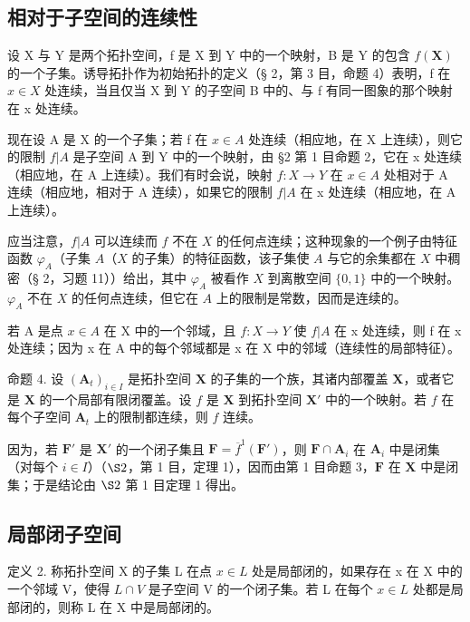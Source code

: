 \subsection{相对于子空间的连续性}

设 X 与 Y 是两个拓扑空间，f 是 X 到 Y 中的一个映射，B 是 Y 的包含 \(f(\mathbf{X})\) 的一个子集。诱导拓扑作为初始拓扑的定义（§ 2，第 3 目，命题 4）表明，f 在 \(x \in X\) 处连续，当且仅当 X 到 Y 的子空间 B 中的、与 f 有同一图象的那个映射在 x 处连续。

现在设 A 是 X 的一个子集；若 f 在 \(x \in A\) 处连续（相应地，在 X 上连续），则它的限制 \(f|A\) 是子空间 A 到 Y 中的一个映射，由 §2 第 1 目命题 2，它在 x 处连续（相应地，在 A 上连续）。我们有时会说，映射 \(f: X \to Y\) 在 \(x \in A\) 处相对于 A 连续（相应地，相对于 A 连续），如果它的限制 \(f|A\) 在 x 处连续（相应地，在 A 上连续）。

应当注意，\(f|A\) 可以连续而 \(f\) 不在 \(X\) 的任何点连续；这种现象的一个例子由特征函数 \(\varphi_A\)（子集 \(A\)（\(X\) 的子集）的特征函数，该子集使 \(A\) 与它的余集都在 \(X\) 中稠密（§ 2，习题 11））给出，其中 \(\varphi_A\) 被看作 \(X\) 到离散空间 \(\{0, 1\}\) 中的一个映射。\(\varphi_A\) 不在 \(X\) 的任何点连续，但它在 \(A\) 上的限制是常数，因而是连续的。

若 A 是点 \(x \in A\) 在 X 中的一个邻域，且 \(f: X \to Y\) 使 \(f|A\) 在 x 处连续，则 f 在 x 处连续；因为 x 在 A 中的每个邻域都是 x 在 X 中的邻域（连续性的局部特征）。

命题 4. 设 \((\mathbf{A}_t)_{i\in I}\) 是拓扑空间 \(\mathbf{X}\) 的子集的一个族，其诸内部覆盖 \(\mathbf{X}\)，或者它是 \(\mathbf{X}\) 的一个局部有限闭覆盖。设 \(f\) 是 \(\mathbf{X}\) 到拓扑空间 \(\mathbf{X}'\) 中的一个映射。若 \(f\) 在每个子空间 \(\mathbf{A}_t\) 上的限制都连续，则 \(f\) 连续。

因为，若 \(\mathbf{F}'\) 是 \(\mathbf{X}'\) 的一个闭子集且 \(\mathbf{F} = \overline{f}^{1} (\mathbf{F}')\)，则 \(\mathbf{F} \cap \mathbf{A}_i\) 在 \(\mathbf{A}_i\) 中是闭集（对每个 \(i \in I\)）（\(\S 2\)，第 1 目，定理 1），因而由第 1 目命题 3，\(\mathbf{F}\) 在 \(\mathbf{X}\) 中是闭集；于是结论由 \(\S 2\) 第 1 目定理 1 得出。

\subsection{局部闭子空间}

定义 2. 称拓扑空间 X 的子集 L 在点 \(x \in L\) 处是局部闭的，如果存在 x 在 X 中的一个邻域 V，使得 \(L \cap V\) 是子空间 V 的一个闭子集。若 L 在每个 \(x \in L\) 处都是局部闭的，则称 L 在 X 中是局部闭的。


